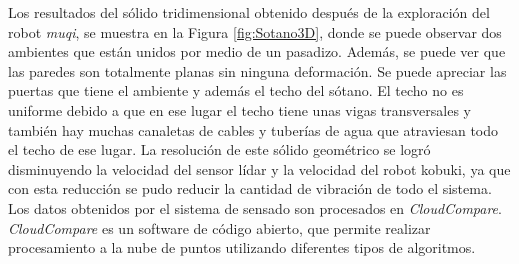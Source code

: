 
Los resultados del sólido tridimensional obtenido después de la exploración del robot
\textit{muqi}, se muestra en la Figura \ref{fig:Sotano3D}, donde se puede observar dos 
ambientes que están unidos por medio de un pasadizo. Además, se puede ver que las paredes 
son totalmente planas sin ninguna deformación. Se puede apreciar las puertas que tiene 
el ambiente y además el techo del sótano. El techo no es uniforme debido a que en ese 
lugar el techo tiene unas vigas transversales y también hay muchas canaletas de cables 
y tuberías de agua que atraviesan todo el techo de ese lugar. La resolución de este 
sólido geométrico se logró disminuyendo la velocidad del sensor lídar y la velocidad 
del robot kobuki, ya que con esta reducción se pudo reducir la cantidad de vibración 
de todo el sistema. Los datos obtenidos por el sistema de sensado son procesados en 
\textit{CloudCompare}. \textit{CloudCompare} es un software de código abierto, que permite realizar 
procesamiento a la nube de puntos utilizando diferentes tipos de algoritmos.

